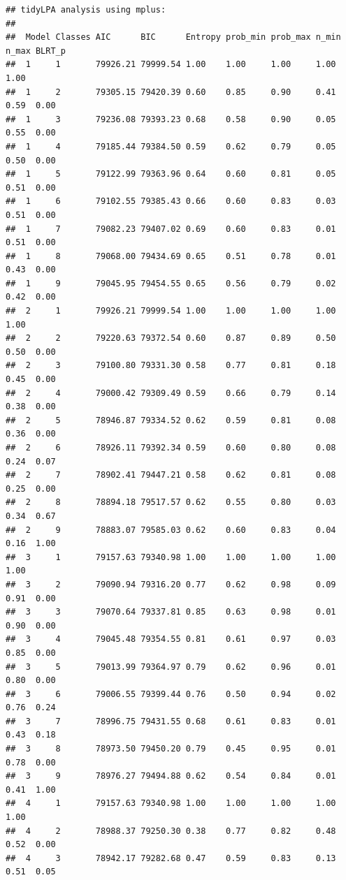 \documentclass[
  english,
  man]{apa6}
\begin{document}
\begin{verbatim}
## tidyLPA analysis using mplus: 
## 
##  Model Classes AIC      BIC      Entropy prob_min prob_max n_min n_max BLRT_p
##  1     1       79926.21 79999.54 1.00    1.00     1.00     1.00  1.00        
##  1     2       79305.15 79420.39 0.60    0.85     0.90     0.41  0.59  0.00  
##  1     3       79236.08 79393.23 0.68    0.58     0.90     0.05  0.55  0.00  
##  1     4       79185.44 79384.50 0.59    0.62     0.79     0.05  0.50  0.00  
##  1     5       79122.99 79363.96 0.64    0.60     0.81     0.05  0.51  0.00  
##  1     6       79102.55 79385.43 0.66    0.60     0.83     0.03  0.51  0.00  
##  1     7       79082.23 79407.02 0.69    0.60     0.83     0.01  0.51  0.00  
##  1     8       79068.00 79434.69 0.65    0.51     0.78     0.01  0.43  0.00  
##  1     9       79045.95 79454.55 0.65    0.56     0.79     0.02  0.42  0.00  
##  2     1       79926.21 79999.54 1.00    1.00     1.00     1.00  1.00        
##  2     2       79220.63 79372.54 0.60    0.87     0.89     0.50  0.50  0.00  
##  2     3       79100.80 79331.30 0.58    0.77     0.81     0.18  0.45  0.00  
##  2     4       79000.42 79309.49 0.59    0.66     0.79     0.14  0.38  0.00  
##  2     5       78946.87 79334.52 0.62    0.59     0.81     0.08  0.36  0.00  
##  2     6       78926.11 79392.34 0.59    0.60     0.80     0.08  0.24  0.07  
##  2     7       78902.41 79447.21 0.58    0.62     0.81     0.08  0.25  0.00  
##  2     8       78894.18 79517.57 0.62    0.55     0.80     0.03  0.34  0.67  
##  2     9       78883.07 79585.03 0.62    0.60     0.83     0.04  0.16  1.00  
##  3     1       79157.63 79340.98 1.00    1.00     1.00     1.00  1.00        
##  3     2       79090.94 79316.20 0.77    0.62     0.98     0.09  0.91  0.00  
##  3     3       79070.64 79337.81 0.85    0.63     0.98     0.01  0.90  0.00  
##  3     4       79045.48 79354.55 0.81    0.61     0.97     0.03  0.85  0.00  
##  3     5       79013.99 79364.97 0.79    0.62     0.96     0.01  0.80  0.00  
##  3     6       79006.55 79399.44 0.76    0.50     0.94     0.02  0.76  0.24  
##  3     7       78996.75 79431.55 0.68    0.61     0.83     0.01  0.43  0.18  
##  3     8       78973.50 79450.20 0.79    0.45     0.95     0.01  0.78  0.00  
##  3     9       78976.27 79494.88 0.62    0.54     0.84     0.01  0.41  1.00  
##  4     1       79157.63 79340.98 1.00    1.00     1.00     1.00  1.00        
##  4     2       78988.37 79250.30 0.38    0.77     0.82     0.48  0.52  0.00  
##  4     3       78942.17 79282.68 0.47    0.59     0.83     0.13  0.51  0.05  

\end{verbatim}
\end{document}
